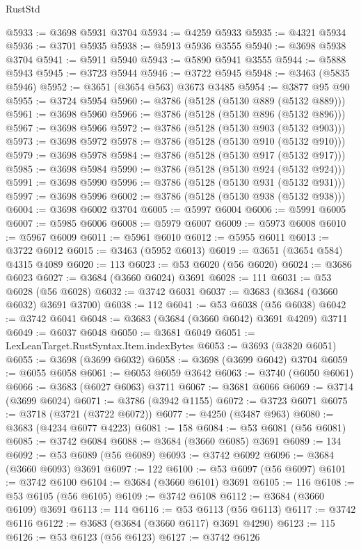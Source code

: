 \begin{lexlean}{RustStd}
\begin{coremodule}
{\begin{coremodule}
{{{{{{{{{{{{{{{{{{{{{{{{{{{{{{{{{{{{{{{{{{{{{{{@5933 := @3698 @5931 @3704
@5934 := @4259 @5933
@5935 := @4321 @5934
@5936 := @3701 @5935
@5938 := @5913 @5936 @3555
@5940 := @3698 @5938 @3704
@5941 := @5911 @5940
@5943 := @5890 @5941 @3555
@5944 := @5888 @5943
@5945 := @3723 @5944
@5946 := @3722 @5945
@5948 := @3463 (@5835 @5946)
@5952 := @3651 (@3654 @563) @3673 @3485
@5954 := @3877 @95 @90
@5955 := @3724 @5954
@5960 := @3786 (@5128 (@5130 @889 (@5132 @889)))
@5961 := @3698 @5960
@5966 := @3786 (@5128 (@5130 @896 (@5132 @896)))
@5967 := @3698 @5966
@5972 := @3786 (@5128 (@5130 @903 (@5132 @903)))
@5973 := @3698 @5972
@5978 := @3786 (@5128 (@5130 @910 (@5132 @910)))
@5979 := @3698 @5978
@5984 := @3786 (@5128 (@5130 @917 (@5132 @917)))
@5985 := @3698 @5984
@5990 := @3786 (@5128 (@5130 @924 (@5132 @924)))
@5991 := @3698 @5990
@5996 := @3786 (@5128 (@5130 @931 (@5132 @931)))
@5997 := @3698 @5996
@6002 := @3786 (@5128 (@5130 @938 (@5132 @938)))
@6004 := @3698 @6002 @3704
@6005 := @5997 @6004
@6006 := @5991 @6005
@6007 := @5985 @6006
@6008 := @5979 @6007
@6009 := @5973 @6008
@6010 := @5967 @6009
@6011 := @5961 @6010
@6012 := @5955 @6011
@6013 := @3722 @6012
@6015 := @3463 (@5952 @6013)
@6019 := @3651 (@3654 @584) @4315 @4089
@6020 := 113
@6023 := @53 @6020 (@56 @6020)
@6024 := @3686 @6023
@6027 := @3684 (@3660 @6024) @3691
@6028 := 111
@6031 := @53 @6028 (@56 @6028)
@6032 := @3742 @6031
@6037 := @3683 (@3684 (@3660 @6032) @3691 @3700)
@6038 := 112
@6041 := @53 @6038 (@56 @6038)
@6042 := @3742 @6041
@6048 := @3683 (@3684 (@3660 @6042) @3691 @4209) @3711
@6049 := @6037 @6048
@6050 := @3681 @6049
@6051 := LexLeanTarget.RustSyntax.Item.indexBytes
@6053 := @3693 (@3820 @6051)
@6055 := @3698 (@3699 @6032)
@6058 := @3698 (@3699 @6042) @3704
@6059 := @6055 @6058
@6061 := @6053 @6059 @3642
@6063 := @3740 (@6050 @6061)
@6066 := @3683 (@6027 @6063) @3711
@6067 := @3681 @6066
@6069 := @3714 (@3699 @6024)
@6071 := @3786 (@3942 @1155)
@6072 := @3723 @6071
@6075 := @3718 (@3721 (@3722 @6072))
@6077 := @4250 (@3487 @963)
@6080 := @3683 (@4234 @6077 @4223)
@6081 := 158
@6084 := @53 @6081 (@56 @6081)
@6085 := @3742 @6084
@6088 := @3684 (@3660 @6085) @3691
@6089 := 134
@6092 := @53 @6089 (@56 @6089)
@6093 := @3742 @6092
@6096 := @3684 (@3660 @6093) @3691
@6097 := 122
@6100 := @53 @6097 (@56 @6097)
@6101 := @3742 @6100
@6104 := @3684 (@3660 @6101) @3691
@6105 := 116
@6108 := @53 @6105 (@56 @6105)
@6109 := @3742 @6108
@6112 := @3684 (@3660 @6109) @3691
@6113 := 114
@6116 := @53 @6113 (@56 @6113)
@6117 := @3742 @6116
@6122 := @3683 (@3684 (@3660 @6117) @3691 @4290)
@6123 := 115
@6126 := @53 @6123 (@56 @6123)
@6127 := @3742 @6126
}}}}}}}}}}}}}}}}}}}}}}}}}}}}}}}}}}}}}}}}}}}}}}}
\end{coremodule}}
\end{coremodule}
\end{lexlean}
